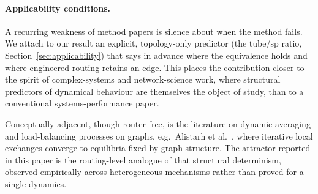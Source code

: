 \paragraph{Applicability conditions.}
A recurring weakness of method papers is silence about when the method fails. We
attach to our result an explicit, topology-only predictor (the tube/sp ratio,
Section~\ref{sec:applicability}) that says in advance where the equivalence
holds and where engineered routing retains an edge. This places the
contribution closer to the spirit of complex-systems and network-science work,
where structural predictors of dynamical behaviour are themselves the object of
study, than to a conventional systems-performance paper.


\medskip
Conceptually adjacent, though router-free, is the literature on dynamic
averaging and load-balancing processes on graphs, e.g.\ Alistarh et
al.~\cite{alistarh2022dynamic}, where iterative local exchanges converge
to equilibria fixed by graph structure. The attractor reported in this
paper is the routing-level analogue of that structural determinism,
observed empirically across heterogeneous mechanisms rather than proved
for a single dynamics.
